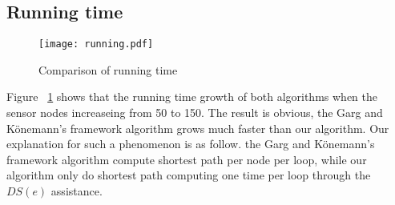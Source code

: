 \documentclass{article}
\begin{document}
\subsection{Running time}
\begin{figure}[H]
\centering
\texttt{[image: running.pdf]} 
\caption{Comparison of running time}
\label{f2}
\end{figure}
Figure ~\ref{f2} shows that the running time growth of both algorithms when the sensor nodes increaseing from 50 to 150. The result is obvious, the Garg and K\"{o}nemann's framework algorithm 
grows much faster than our algorithm. Our explanation for such a phenomenon is as follow. the Garg and K\"{o}nemann's framework algorithm compute shortest path per node per loop, while our algorithm only do shortest path computing one time per loop through the $DS(e)$ assistance.
\end{document}
